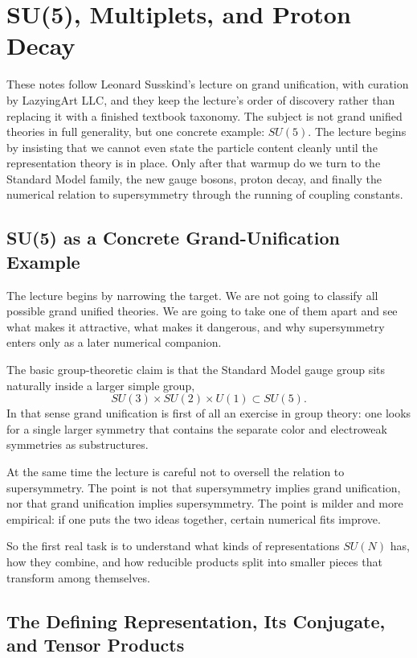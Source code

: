 \chapter{SU(5), Multiplets, and Proton Decay}

These notes follow Leonard Susskind's lecture on grand unification, with curation by LazyingArt LLC, and they keep the lecture's order of discovery rather than replacing it with a finished textbook taxonomy. The subject is not grand unified theories in full generality, but one concrete example: \(SU(5)\). The lecture begins by insisting that we cannot even state the particle content cleanly until the representation theory is in place. Only after that warmup do we turn to the Standard Model family, the new gauge bosons, proton decay, and finally the numerical relation to supersymmetry through the running of coupling constants.

\section{SU(5) as a Concrete Grand-Unification Example}

The lecture begins by narrowing the target. We are not going to classify all possible grand unified theories. We are going to take one of them apart and see what makes it attractive, what makes it dangerous, and why supersymmetry enters only as a later numerical companion.

The basic group-theoretic claim is that the Standard Model gauge group sits naturally inside a larger simple group,
\begin{equation}
SU(3)\times SU(2)\times U(1)\subset SU(5).
\end{equation}
In that sense grand unification is first of all an exercise in group theory: one looks for a single larger symmetry that contains the separate color and electroweak symmetries as substructures.

At the same time the lecture is careful not to oversell the relation to supersymmetry. The point is not that supersymmetry implies grand unification, nor that grand unification implies supersymmetry. The point is milder and more empirical: if one puts the two ideas together, certain numerical fits improve.

So the first real task is to understand what kinds of representations \(SU(N)\) has, how they combine, and how reducible products split into smaller pieces that transform among themselves.

\section{The Defining Representation, Its Conjugate, and Tensor Products}

